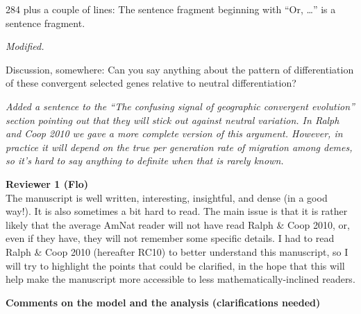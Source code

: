 \documentclass[12pt,letterpaper]{article}
\newcommand{\response}[1]{\emph{ \color{blue} #1}}
\begin{document}
284 plus a couple of lines: The sentence fragment beginning with ``Or, \ldots'' is a sentence fragment.

\response{Modified.}

Discussion, somewhere: Can you say anything about the pattern of differentiation of these convergent selected genes relative to neutral differentiation? 

\response{Added a sentence to the ``The confusing signal of geographic convergent evolution'' section pointing out that they will stick out against neutral variation. In Ralph and Coop 2010 we gave a more complete version of this argument. However, in practice it will depend on the true per generation rate of migration among demes, so it's hard to say anything to definite when that is rarely known.}

\newpage


{\bf Reviewer 1 (Flo)}\\


The manuscript is well written, interesting, insightful, and dense (in a good way!). It is also sometimes a bit hard to read. The main issue is that it is rather likely that the average AmNat reader will not have read Ralph \& Coop 2010, or, even if they have, they will not remember some specific details. I had to read Ralph \& Coop 2010 (hereafter RC10) to better understand this manuscript, so I will try to highlight the points that could be clarified, in the hope that this will help make the manuscript more accessible to less mathematically-inclined readers.

\textbf{Comments on the model and the analysis (clarifications needed)}
\end{document}
